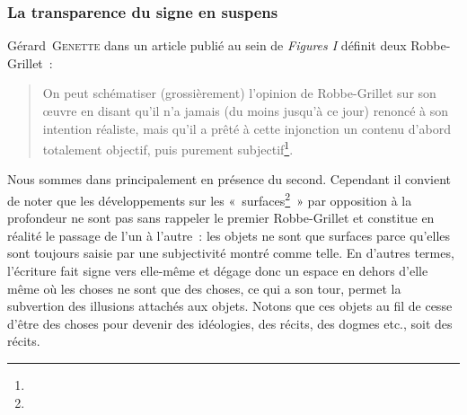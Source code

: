 \documentclass[12pt, a4paper]{article}
\begin{document}
\subsubsection{La transparence du signe en suspens}
\label{signe}


Gérard~\textsc{Genette} dans un article publié au sein de \textit{Figures I} définit deux Robbe-Grillet~:
\begin{quote}
    On peut schématiser (grossièrement) l'opinion de Robbe-Grillet sur son œuvre en disant qu'il n'a jamais (du moins jusqu'à ce jour) renoncé à son intention réaliste, mais qu'il a prêté à cette injonction un contenu d'abord totalement objectif, puis purement subjectif\footnote{}.
\end{quote}
Nous sommes dans \punr{} principalement en présence du second. Cependant il convient de noter que les développements sur les «~surfaces\footnote{}~» par opposition à la profondeur ne sont pas sans rappeler le premier Robbe-Grillet et constitue en réalité le passage de l'un à l'autre~: les objets ne sont que surfaces parce qu'elles sont toujours saisie par une subjectivité montré comme telle. En d'autres termes, l'écriture fait signe vers elle-même et dégage donc un espace en dehors d'elle même où les choses ne sont que des choses, ce qui a son tour, permet la subvertion des illusions attachés aux objets. Notons que ces objets au fil de \punr{} cesse d'être des choses pour devenir des idéologies, des récits, des dogmes etc., soit des récits.
\end{document}

